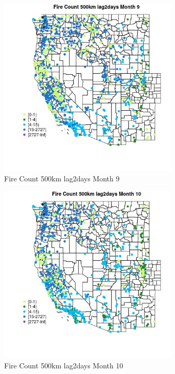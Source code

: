 \begin{figure} 
\centering  
\includegraphics[width=0.77\textwidth]{Code_Outputs/Report_ML_input_PM25_Step4_part_f_de_duplicated_aveswNAs_MapObsMo9Fire_Count_500km_lag2days.jpg} 
\caption{\label{fig:Report_ML_input_PM25_Step4_part_f_de_duplicated_aveswNAsMapObsMo9Fire_Count_500km_lag2days}Fire Count 500km lag2days Month 9} 
\end{figure} 
 

\begin{figure} 
\centering  
\includegraphics[width=0.77\textwidth]{Code_Outputs/Report_ML_input_PM25_Step4_part_f_de_duplicated_aveswNAs_MapObsMo10Fire_Count_500km_lag2days.jpg} 
\caption{\label{fig:Report_ML_input_PM25_Step4_part_f_de_duplicated_aveswNAsMapObsMo10Fire_Count_500km_lag2days}Fire Count 500km lag2days Month 10} 
\end{figure} 
 

